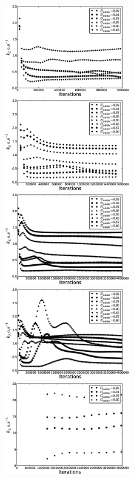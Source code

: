 \documentclass{article}
\begin{document}
\begin{figure}[htb!]
\includegraphics[width=0.5\textwidth]{Figures/steady_state_per_entrance.eps}
\includegraphics[width=0.5\textwidth]{Figures/steady_state_inlet_aver.eps}\\
\includegraphics[width=0.5\textwidth]{Figures/steady_state_per_aver.eps}
\includegraphics[width=0.5\textwidth]{Figures/steady_state_per_middle_outlet.eps}\\
\includegraphics[width=0.5\textwidth]{Figures/steady_state_jos_inlet_outlet.eps}\\
\caption{\label{fig:comparison:one:unit:cell}}
\end{figure}
\end{document}
